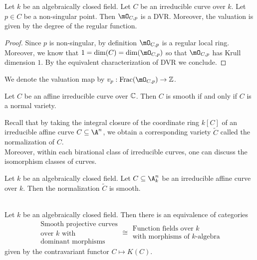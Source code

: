 \documentclass[a4paper]{article}
\begin{document}
\begin{lmm}{}{} Let $k$ be an algebraically closed field. Let $C$ be an irreducible curve over $k$. Let $p\in C$ be a non-singular point. Then $\mO_{C,p}$ is a DVR. Moreover, the valuation is given by the degree of the regular function. 
\begin{proof}
Since $p$ is non-singular, by definition $\mO_{C,p}$ is a regular local ring. Moreover, we know that $1=\dim(C)=\dim(\mO_{C,p})$ so that $\mO_{C,p}$ has Krull dimension $1$. By the equivalent characterization of DVR we conclude. 
\end{proof}
\end{lmm}

We denote the valuation map by $v_p:\text{Frac}(\mO_{C,p})\to\Z$. 

\begin{prp}{}{} Let $C$ be an affine irreducible curve over $\mathbb{C}$. Then $C$ is smooth if and only if $C$ is a normal variety. 
\end{prp}

Recall that by taking the integral closure of the coordinate ring $k[C]$ of an irreducible affine curve $C\subseteq\A^n$, we obtain a corresponding variety $\widetilde{C}$ called the normalization of $C$. \\

Moreover, within each birational class of irreducible curves, one can discuss the isomorphism classes of curves. 

\begin{crl}{}{} Let $k$ be an algebraically closed field. Let $C\subseteq\A_k^n$ be an irreducible affine curve over $k$. Then the normalization $\widetilde{C}$ is smooth. 
\end{crl}

\begin{prp}{}{}\\
Let $k$ be an algebraically closed field. Then there is an equivalence of categories $$\substack{\text{Smooth projective curves}\\\text{over }k\text{ with}\\\text{dominant morphisms}}\cong\substack{\text{Function fields over }k\\\text{with morphisms of }k\text{-algebra}}$$ given by the contravariant functor $C\mapsto K(C)$. 
\end{prp}
\end{document}
